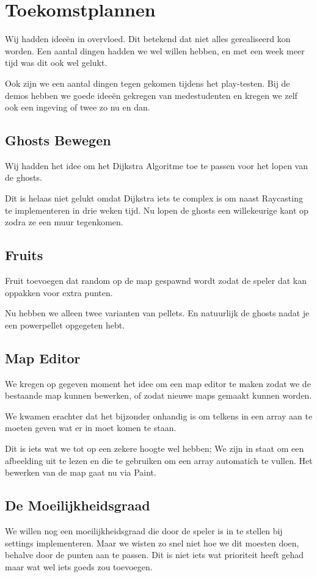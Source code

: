 \documentclass{report}
\begin{document}
\chapter{Toekomstplannen} %
\label{cha:toekomstplannen}
Wij hadden ideeën in overvloed. Dit betekend dat niet alles gerealiseerd kon worden. Een aantal dingen hadden we wel willen hebben, en met een week meer tijd was dit ook wel gelukt.

Ook zijn we een aantal dingen tegen gekomen tijdens het play-testen. Bij de demos hebben we goede ideeën gekregen van medestudenten en kregen we zelf ook een ingeving of twee zo nu en dan.

  \section{Ghosts Bewegen}
  Wij hadden het idee om het Dijkstra Algoritme toe te passen voor het lopen van de ghosts.

  Dit is helaas niet gelukt omdat Dijkstra iets te complex is om naast Raycasting te implementeren in drie weken tijd. Nu lopen de ghosts een willekeurige kant op zodra ze een muur tegenkomen.

  \section{Fruits}
  Fruit toevoegen dat random op de map gespawnd wordt zodat de speler dat kan oppakken voor extra punten.

  Nu hebben we alleen twee varianten van pellets. En natuurlijk de ghosts nadat je een powerpellet opgegeten hebt.

  \section{Map Editor}
  We kregen op gegeven moment het idee om een map editor te maken zodat we de bestaande map kunnen bewerken, of zodat nieuwe maps gemaakt kunnen worden.

  We kwamen erachter dat het bijzonder onhandig is om telkens in een array aan te moeten geven wat er in moet komen te staan.

  Dit is iets wat we tot op een zekere hoogte wel hebben; We zijn in staat om een afbeelding uit te lezen en die te gebruiken om een array automatich te vullen. Het bewerken van de map gaat nu via Paint.

  \section{De Moeilijkheidsgraad}
  We willen nog een moeilijkheidsgraad die door de speler is in te stellen bij settings implementeren. Maar we wisten zo snel niet hoe we dit moesten doen, behalve door de punten aan te passen. Dit is niet iets wat prioriteit heeft gehad maar wat wel iets goeds zou toevoegen.
\end{document}
